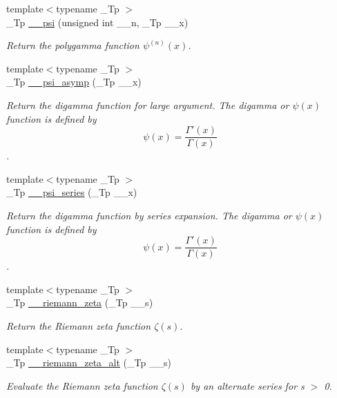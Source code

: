 \begin{DoxyCompactItemize}
{\footnotesize template$<$typename \+\_\+\+Tp $>$ }\\\+\_\+\+Tp \hyperlink{namespacestd_1_1____detail_a96d6b8301ca54615364a53665b347f6c}{\+\_\+\+\_\+psi} (unsigned int \+\_\+\+\_\+n, \+\_\+\+Tp \+\_\+\+\_\+x)
\begin{DoxyCompactList}\small\item\em Return the polygamma function $ \psi^{(n)}(x) $. \end{DoxyCompactList}\item 
{\footnotesize template$<$typename \+\_\+\+Tp $>$ }\\\+\_\+\+Tp \hyperlink{namespacestd_1_1____detail_a2557b5d815b6667bc9228c1e8a2a16ae}{\+\_\+\+\_\+psi\+\_\+asymp} (\+\_\+\+Tp \+\_\+\+\_\+x)
\begin{DoxyCompactList}\small\item\em Return the digamma function for large argument. The digamma or $ \psi(x) $ function is defined by \[ \psi(x) = \frac{\Gamma'(x)}{\Gamma(x)} \]. \end{DoxyCompactList}\item 
{\footnotesize template$<$typename \+\_\+\+Tp $>$ }\\\+\_\+\+Tp \hyperlink{namespacestd_1_1____detail_a378e78e1c3c08b8f146acf32a26e831a}{\+\_\+\+\_\+psi\+\_\+series} (\+\_\+\+Tp \+\_\+\+\_\+x)
\begin{DoxyCompactList}\small\item\em Return the digamma function by series expansion. The digamma or $ \psi(x) $ function is defined by \[ \psi(x) = \frac{\Gamma'(x)}{\Gamma(x)} \]. \end{DoxyCompactList}\item 
{\footnotesize template$<$typename \+\_\+\+Tp $>$ }\\\+\_\+\+Tp \hyperlink{namespacestd_1_1____detail_a2be77d9bdd1b8b463be44a0e7558bc2a}{\+\_\+\+\_\+riemann\+\_\+zeta} (\+\_\+\+Tp \+\_\+\+\_\+s)
\begin{DoxyCompactList}\small\item\em Return the Riemann zeta function $ \zeta(s) $. \end{DoxyCompactList}\item 
{\footnotesize template$<$typename \+\_\+\+Tp $>$ }\\\+\_\+\+Tp \hyperlink{namespacestd_1_1____detail_a4b3f83cafed65af679eedcf37fefff00}{\+\_\+\+\_\+riemann\+\_\+zeta\+\_\+alt} (\+\_\+\+Tp \+\_\+\+\_\+s)
\begin{DoxyCompactList}\small\item\em Evaluate the Riemann zeta function $ \zeta(s) $ by an alternate series for s $>$ 0. \end{DoxyCompactList}\item 

\end{DoxyCompactItemize}
